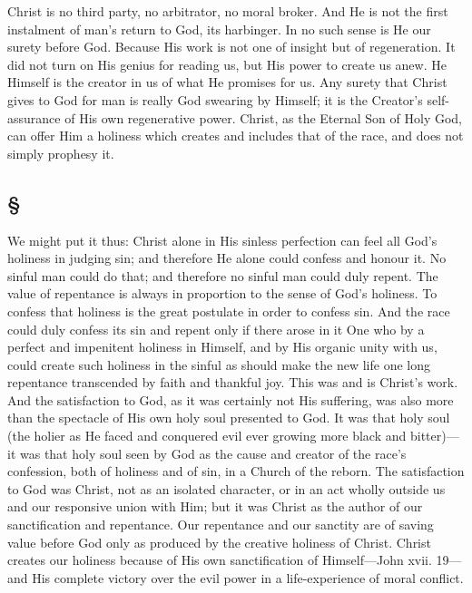 \documentclass[draft]{ptfdoc}
\begin{document}
Christ is no third party, no arbitrator, no 
moral broker. And He is not the first instalment 
of man's return to God, its harbinger. In 
no such sense is He our surety before God. 
Because His work is not one of insight but 
of regeneration. It did not turn on His genius 
for reading us, but His power to create us 
anew. He Himself is the creator in us of 
what He promises for us. Any surety that 
Christ gives to God for man is really God swearing 
by Himself; it is the Creator's self-assurance 
of His own regenerative power. Christ, as the 
Eternal Son of Holy God, can offer Him a holiness 
which creates and includes that of the race, 
and does not simply prophesy it. 

\subsection*{
\S
}

We might put it thus: Christ alone in His 
sinless perfection can feel all God's holiness in 
judging sin; and therefore He alone could 
confess and honour it. No sinful man could do 
that; and therefore no sinful man could duly 
repent. The value of repentance is always in 
proportion to the sense of God's holiness. To 
confess that holiness is the great postulate in 
order to confess sin. And the race could duly 
confess its sin and repent only if there arose in it 
One who by a perfect and impenitent holiness in 
Himself, and by His organic unity with us, could 
create such holiness in the sinful as should make 
the new life one long repentance transcended by 
faith and thankful joy. This was and is Christ's 
work. And the satisfaction to God, as it was 
certainly not His suffering, was also more than 
the spectacle of His own holy soul presented to 
God. It was that holy soul (the holier as He 
faced and conquered evil ever growing more 
black and bitter)---it was that holy soul seen 
by God as the cause and creator of the race's 
confession, both of holiness and of sin, in a 
Church of the reborn. The satisfaction to God 
was Christ, not as an isolated character, or in 
an act wholly outside us and our responsive 
union with Him; but it was Christ as the 
author of our sanctification and repentance. 
Our repentance and our sanctity are of saving 
value before God only as produced by the creative 
holiness of Christ. Christ creates our holiness 
because of His own sanctification of Himself---John 
xvii. 19---and His complete victory over 
the evil power in a life-experience of moral 
conflict. 
\end{document}
